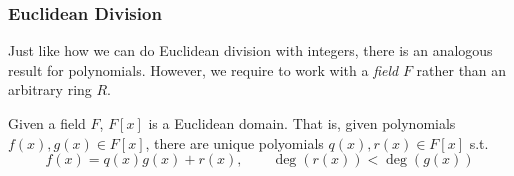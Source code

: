 \subsubsection{Euclidean Division} 

  Just like how we can do Euclidean division with integers, there is an analogous result for polynomials. However, we require to work with a \textit{field} $F$ rather than an arbitrary ring $R$. 

  \begin{theorem}
    Given a field $F$, $F[x]$ is a Euclidean domain. That is, given polynomials $f(x), g(x) \in F[x]$, there are unique polyomials $q(x), r(x) \in F[x]$ s.t. 
    \begin{equation}
      f(x) = q(x) g(x) + r(x), \qquad \deg(r(x)) < \deg(g(x))
    \end{equation} 
  \end{theorem} 
